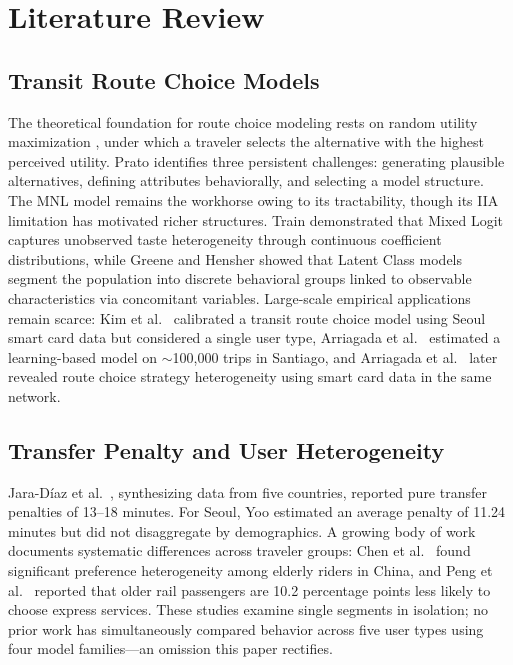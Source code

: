 \section{Literature Review}

\subsection{Transit Route Choice Models}

The theoretical foundation for route choice modeling rests on random utility
maximization \cite{benakiva1985}, under which a traveler selects the
alternative with the highest perceived utility. Prato \cite{prato2009}
identifies three persistent challenges: generating plausible alternatives,
defining attributes behaviorally, and selecting a model structure. The MNL
model \cite{mcfadden1974} remains the workhorse owing to its tractability,
though its IIA limitation has motivated richer structures. Train
\cite{train2009} demonstrated that Mixed Logit captures unobserved taste
heterogeneity through continuous coefficient distributions, while Greene and
Hensher \cite{greene2003} showed that Latent Class models segment the
population into discrete behavioral groups linked to observable
characteristics via concomitant variables. Large-scale empirical applications
remain scarce: Kim et al.\ \cite{kim2020} calibrated a transit route choice
model using Seoul smart card data but considered a single user type, Arriagada
et al.\ \cite{arriagada2025} estimated a learning-based model on
$\sim$100,000 trips in Santiago, and Arriagada et al.\ \cite{arriagada2022}
later revealed route choice strategy heterogeneity using smart card data in
the same network.

\subsection{Transfer Penalty and User Heterogeneity}

Jara-D\'iaz et al.\ \cite{jaradiaz2022}, synthesizing data from five
countries, reported pure transfer penalties of 13--18 minutes. For Seoul, Yoo
\cite{yoo2015} estimated an average penalty of 11.24 minutes but did not
disaggregate by demographics. A growing body of work documents systematic
differences across traveler groups: Chen et al.\ \cite{chen2021} found
significant preference heterogeneity among elderly riders in China, and Peng
et al.\ \cite{peng2024} reported that older rail passengers are 10.2
percentage points less likely to choose express services. These studies
examine single segments in isolation; no prior work has simultaneously
compared behavior across five user types using four model families---an
omission this paper rectifies.

